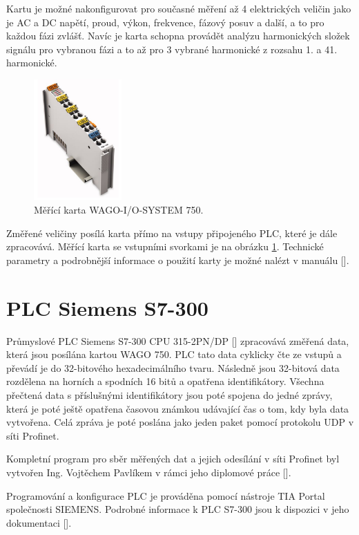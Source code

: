 Kartu je možné nakonfigurovat pro současné měření až 4 elektrických veličin jako je AC a DC napětí, proud, výkon, frekvence, fázový posuv a další, a to pro každou fázi zvlášť. Navíc je karta schopna provádět analýzu harmonických složek signálu pro vybranou fázi a to až pro 3 vybrané harmonické z rozsahu 1. a 41. harmonické. 

\begin{figure}[ht]
    \includegraphics[width=0.3\textwidth]{wago_obr}
    \caption{Měřící karta WAGO-I/O-SYSTEM 750.}
    \label{wago_pic}
\end{figure}

Změřené veličiny posílá karta přímo na vstupy připojeného PLC, které je dále zpracovává. Měřící karta se vstupními svorkami je na obrázku \ref{wago_pic}. Technické parametry a podrobnější informace o použití karty je možné nalézt v manuálu [\cite{wago}].

\section{PLC Siemens S7-300}

Průmyslové PLC Siemens S7-300 CPU 315-2PN/DP [\cite{siemens_plc}] zpracovává změřená data, která jsou posílána kartou WAGO 750. PLC tato data cyklicky čte ze vstupů a převádí je do 32-bitového hexadecimálního tvaru. Následně jsou 32-bitová data rozdělena na horních a spodních 16 bitů a opatřena identifikátory. Všechna přečtená data s příslušnými identifikátory jsou poté spojena do jedné zprávy, která je poté ještě opatřena časovou známkou udávající čas o tom, kdy byla data vytvořena. Celá zpráva je poté poslána jako jeden paket pomocí protokolu UDP v síti Profinet.  

Kompletní program pro sběr měřených dat a jejich odesílání v síti Profinet byl vytvořen Ing. Vojtěchem Pavlíkem v rámci jeho diplomové práce [\cite{vojtech_pavlik}]. 

Programování a konfigurace PLC je prováděna pomocí nástroje TIA Portal společnosti SIEMENS. Podrobné informace k PLC S7-300 jsou k dispozici v jeho dokumentaci [\cite{siemens_plc}].  

